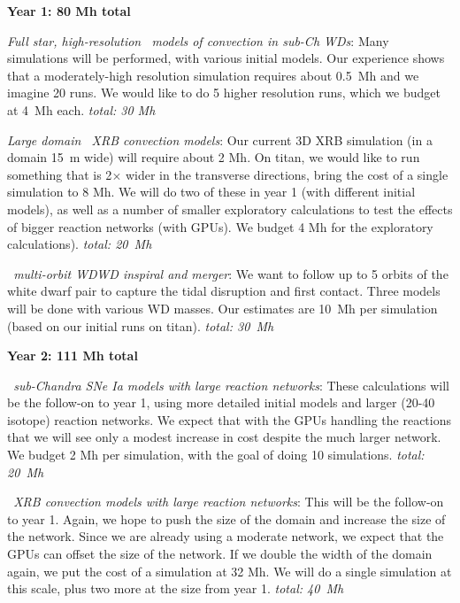 \begin{tightitem}
\item {\bf Year 1: 80 Mh total }
%
\begin{tightitem}
\item {\em Full star, high-resolution \maestro\ models of convection
  in sub-Ch WDs}: Many simulations will be performed, with
  various initial models.  Our experience shows that a moderately-high
  resolution simulation requires about 0.5~Mh and we imagine 20 runs.
  We would like to do 5 higher resolution runs, which we budget at 4~Mh
  each.  {\em total: 30 Mh}

\item {\em Large domain \maestro\ XRB convection models}: Our current
  3D XRB simulation (in a domain 15~m wide) will require about 2 Mh.
  On titan, we would like to run something that is 2$\times$ wider in
  the transverse directions, bring the cost of a single simulation to
  8 Mh.  We will do two of these in year 1 (with different initial
  models), as well as a number of smaller exploratory calculations to
  test the effects of bigger reaction networks (with GPUs).  We budget 
  4 Mh for the exploratory
  calculations).  {\em total: 20~Mh}

\item {\em \castro\ multi-orbit WDWD inspiral and merger}: We want
  to follow up to 5 orbits of the white dwarf pair to capture the
  tidal disruption and first contact.  Three models will be done
  with various WD masses.  Our estimates are 10~Mh per simulation
  (based on our initial runs on titan).  {\em total: 30~Mh}
\end{tightitem}
%  
\item {\bf Year 2: 111 Mh total}
%
\begin{tightitem}
\item {\em \maestro\ sub-Chandra SNe Ia models with large reaction
  networks}: These calculations will be the follow-on to year 1, using
  more detailed initial models and larger (20-40 isotope) reaction
  networks.  We expect that with the GPUs handling the reactions that
  we will see only a modest increase in cost despite the much larger
  network.  We budget 2 Mh per simulation, with the goal of doing 10
  simulations.  {\em total: 20~Mh}

\item {\em \maestro\ XRB convection models with large reaction networks}:
  This will be the follow-on to year 1.  Again, we hope to push the
  size of the domain and increase the size of the network.  Since we 
  are already using a moderate network, we expect that the GPUs
  can offset the size of the network.  If we double the width of
  the domain again, we put the cost of a simulation at 32 Mh.  We 
  will do a single simulation at this scale, plus two more
  at the size from year 1. {\em total: 40~Mh}


\end{tightitem}
\end{tightitem}
